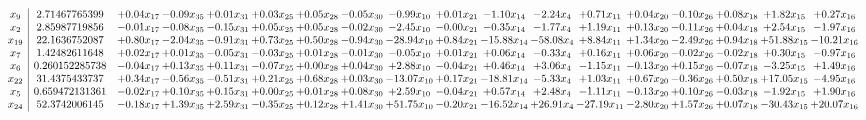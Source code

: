 \documentclass[9pt]{article}
\begin{document}
 \[\begin{array}{c| c c@{\hskip 2pt} c@{\hskip 2pt} c@{\hskip 2pt} c@{\hskip 2pt} c@{\hskip 2pt} c@{\hskip 2pt} c@{\hskip 2pt} c@{\hskip 2pt} c@{\hskip 2pt} c@{\hskip 2pt} c@{\hskip 2pt} c@{\hskip 2pt} c@{\hskip 2pt} c@{\hskip 2pt} c@{\hskip 2pt} c@{\hskip 2pt} }
 x_{9}   &  2.71467765399 & +  0.04 x_{17} & -0.09 x_{35} & +  0.01 x_{31} & +  0.03 x_{25} & +  0.05 x_{28} & -0.05 x_{30} & -0.99 x_{10} & +  0.01 x_{21} & -1.10 x_{14} & -2.24 x_{4} & +  0.71 x_{11} & +  0.04 x_{20} & -0.10 x_{26} & +  0.08 x_{18} & +  1.82 x_{15} & +  0.27 x_{16}\\
 x_{2}   &  2.85987719856 & -0.01 x_{17} & -0.08 x_{35} & -0.15 x_{31} & +  0.05 x_{25} & +  0.05 x_{28} & -0.02 x_{30} & -2.45 x_{10} & -0.00 x_{21} & -0.35 x_{14} & -1.77 x_{4} & +  1.19 x_{11} & +  0.13 x_{20} & -0.11 x_{26} & +  0.04 x_{18} & +  2.54 x_{15} & -1.97 x_{16}\\
 x_{19}   &  22.1636752087 & +  0.80 x_{17} & -2.04 x_{35} & -0.91 x_{31} & +  0.73 x_{25} & +  0.50 x_{28} & -0.94 x_{30} & -28.94 x_{10} & +  0.84 x_{21} & -15.88 x_{14} & -58.08 x_{4} & +  8.84 x_{11} & +  1.34 x_{20} & -2.49 x_{26} & +  0.94 x_{18} & + 51.88 x_{15} & -10.21 x_{16}\\
 x_{7}   &  1.42482611648 & +  0.02 x_{17} & +  0.01 x_{35} & -0.05 x_{31} & -0.03 x_{25} & +  0.01 x_{28} & -0.01 x_{30} & -0.05 x_{10} & +  0.01 x_{21} & +  0.06 x_{14} & -0.33 x_{4} & +  0.16 x_{11} & +  0.06 x_{20} & -0.02 x_{26} & -0.02 x_{18} & +  0.30 x_{15} & -0.97 x_{16}\\
 x_{6}   &  0.260152285738 & -0.04 x_{17} & +  0.13 x_{35} & +  0.11 x_{31} & -0.07 x_{25} & +  0.00 x_{28} & +  0.04 x_{30} & +  2.88 x_{10} & -0.04 x_{21} & +  0.46 x_{14} & +  3.06 x_{4} & -1.15 x_{11} & -0.13 x_{20} & +  0.15 x_{26} & -0.07 x_{18} & -3.25 x_{15} & +  1.49 x_{16}\\
 x_{22}   &  31.4375433737 & +  0.34 x_{17} & -0.56 x_{35} & -0.51 x_{31} & +  0.21 x_{25} & +  0.68 x_{28} & +  0.03 x_{30} & -13.07 x_{10} & +  0.17 x_{21} & -18.81 x_{14} & -5.33 x_{4} & +  1.03 x_{11} & +  0.67 x_{20} & -0.36 x_{26} & +  0.50 x_{18} & + 17.05 x_{15} & -4.95 x_{16}\\
 x_{5}   &  0.659472131361 & -0.02 x_{17} & +  0.10 x_{35} & +  0.15 x_{31} & +  0.00 x_{25} & +  0.01 x_{28} & +  0.08 x_{30} & +  2.59 x_{10} & -0.04 x_{21} & +  0.57 x_{14} & +  2.48 x_{4} & -1.11 x_{11} & -0.13 x_{20} & +  0.10 x_{26} & -0.03 x_{18} & -1.92 x_{15} & +  1.90 x_{16}\\
 x_{24}   &  52.3742006145 & -0.18 x_{17} & +  1.39 x_{35} & +  2.59 x_{31} & -0.35 x_{25} & +  0.12 x_{28} & +  1.41 x_{30} & + 51.75 x_{10} & -0.20 x_{21} & -16.52 x_{14} & + 26.91 x_{4} & -27.19 x_{11} & -2.80 x_{20} & +  1.57 x_{26} & +  0.07 x_{18} & -30.43 x_{15} & + 20.07 x_{16}\\

\end{array}\]
\end{document}
